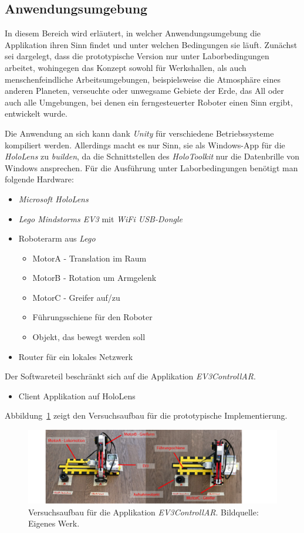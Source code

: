 \subsection{Anwendungsumgebung}
In diesem Bereich wird erläutert, in welcher Anwendungsumgebung die Applikation ihren Sinn findet und unter welchen Bedingungen sie läuft. Zunächst sei dargelegt, dass die prototypische Version nur unter Laborbedingungen arbeitet, wohingegen das Konzept sowohl für Werkshallen, als auch menschenfeindliche Arbeitsumgebungen,
beispielsweise die Atmosphäre eines anderen Planeten, verseuchte oder unwegsame
Gebiete der Erde, das All oder auch alle Umgebungen, bei denen ein ferngesteuerter Roboter einen Sinn ergibt, entwickelt wurde.

Die Anwendung an sich kann dank \textit{Unity} für verschiedene Betriebssysteme kompiliert werden. Allerdings macht es nur Sinn, sie als Windows-App für die \textit{HoloLens} zu \textit{builden}, da die Schnittstellen des \textit{HoloToolkit} nur die Datenbrille von Windows ansprechen. Für die Ausführung unter Laborbedingungen benötigt man folgende Hardware:
\begin{itemize}
	\item \textit{Microsoft HoloLens}
	\item \textit{Lego Mindstorms EV3} mit \textit{WiFi USB-Dongle}
	\item Roboterarm aus \textit{Lego}
	\begin{itemize}
		\item MotorA - Translation im Raum
		\item MotorB - Rotation um Armgelenk
		\item MotorC - Greifer auf/zu
		\item Führungsschiene für den Roboter
		\item Objekt, das bewegt werden soll
	\end{itemize}
	\item Router für ein lokales Netzwerk
\end{itemize}
Der Softwareteil beschränkt sich auf die Applikation \textit{EV3ControllAR}.
\begin{itemize}
	\item Client Applikation auf HoloLens
\end{itemize}
Abbildung~\ref{fig:ev3_robot} zeigt den Versuchsaufbau für die prototypische Implementierung.
\begin{figure}[H]
	\centering
	\includegraphics[width=1.0\textwidth]{figuren/ev3_robot}
	\caption{Versuchsaufbau für die Applikation \textit{EV3ControllAR}. Bildquelle: Eigenes Werk.}
	\label{fig:ev3_robot}
\end{figure}
%
